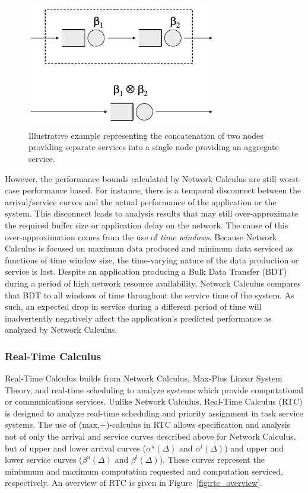 \begin{figure}[htb]
	\centering
	\includegraphics[width=0.75\textwidth]{figs/nc_concatenation.png}
	\caption{Illustrative example representing the concatenation of two nodes providing separate services into a single node providing an aggregate service.}
	\label{fig:nc_concatenation}
\end{figure}

However, the performance bounds calculated by Network Calculus are still worst-case performance based.  For instance, there is a temporal disconnect between the arrival/service curves and the actual performance of the application or the system.  This disconnect leads to analysis results that may still over-approximate the required buffer size or application delay on the network.  The cause of this over-approximation comes from the use of \emph{time windows}.  Because Network Calculus is focused on maximum data produced and minimum data serviced as functions of time window size, the time-varying nature of the data production or service is lost.  Despite an application producing a Bulk Data Transfer (BDT) during a period of high network resource availability, Network Calculus compares that BDT to all windows of time throughout the service time of the system.  As such, an expected drop in service during a different period of time will inadvertently negatively affect the application's predicted performance as analyzed by Network Calculus. 

\subsubsection{Real-Time Calculus}
Real-Time Calculus\cite{Thiele00real-timecalculus} builds from Network Calculus, Max-Plus Linear System Theory, and real-time scheduling to analyze systems which provide computational or communications services.  Unlike Network Calculus, Real-Time Calculus (RTC) is designed to analyze real-time scheduling and priority assignment in task service systems.  The use of (max,+)-calculus in RTC allows specification and analysis not of only the arrival and service curves described above for Network Calculus, but of upper and lower arrival curves ($\alpha^u(\Delta)$ and $\alpha^l(\Delta)$) and upper and lower service curves ($\beta^u(\Delta)$ and $\beta^l(\Delta)$).  These curves represent the miniumum and maximum computation requested and computation serviced, respectively.  An overview of RTC is given in Figure~\ref{fig:rtc_overview}.

